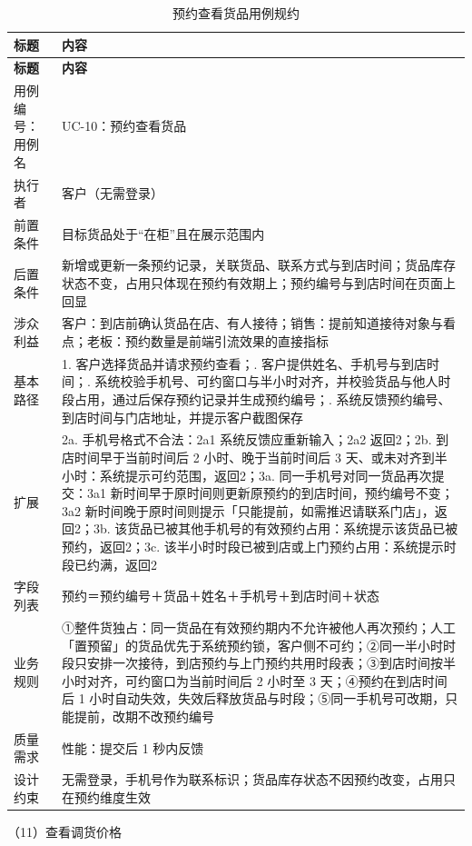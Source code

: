 {\small
\begin{longtable}{@{}L{3.0cm} L{12.3cm}@{}}
\caption{预约查看货品用例规约}\label{tab:uc-10}\\
\toprule
\textbf{标题} & \textbf{内容} \\
\midrule
\endfirsthead
\toprule
\textbf{标题} & \textbf{内容} \\
\midrule
\endhead
用例编号：用例名 & UC-10：预约查看货品 \\
\midrule
执行者 & 客户（无需登录） \\
\midrule
前置条件 & 目标货品处于“在柜”且在展示范围内 \\
\midrule
后置条件 & 新增或更新一条预约记录，关联货品、联系方式与到店时间；货品库存状态不变，占用只体现在预约有效期上；预约编号与到店时间在页面上回显 \\
\midrule
涉众利益 & 客户：到店前确认货品在店、有人接待；\newline 销售：提前知道接待对象与看点；\newline 老板：预约数量是前端引流效果的直接指标 \\
\midrule
基本路径 & 1. 客户选择货品并请求预约查看；. 客户提供姓名、手机号与到店时间；. 系统校验手机号、可约窗口与半小时对齐，并校验货品与他人时段占用，通过后保存预约记录并生成预约编号；. 系统反馈预约编号、到店时间与门店地址，并提示客户截图保存 \\
\midrule
扩展 & 2a. 手机号格式不合法：2a1 系统反馈应重新输入；2a2 返回2；\newline 2b. 到店时间早于当前时间后 2 小时、晚于当前时间后 3 天、或未对齐到半小时：系统提示可约范围，返回2；\newline 3a. 同一手机号对同一货品再次提交：3a1 新时间早于原时间则更新原预约的到店时间，预约编号不变；3a2 新时间晚于原时间则提示「只能提前，如需推迟请联系门店」，返回2；\newline 3b. 该货品已被其他手机号的有效预约占用：系统提示该货品已被预约，返回2；\newline 3c. 该半小时时段已被到店或上门预约占用：系统提示时段已约满，返回2 \\
\midrule
字段列表 & 预约＝预约编号＋货品＋姓名＋手机号＋到店时间＋状态 \\
\midrule
业务规则 & ①整件货独占：同一货品在有效预约期内不允许被他人再次预约；人工「置预留」的货品优先于系统预约锁，客户侧不可约；\newline ②同一半小时时段只安排一次接待，到店预约与上门预约共用时段表；\newline ③到店时间按半小时对齐，可约窗口为当前时间后 2 小时至 3 天；\newline ④预约在到店时间后 1 小时自动失效，失效后释放货品与时段；\newline ⑤同一手机号可改期，只能提前，改期不改预约编号 \\
\midrule
质量需求 & 性能：提交后 1 秒内反馈 \\
\midrule
设计约束 & 无需登录，手机号作为联系标识；货品库存状态不因预约改变，占用只在预约维度生效 \\
\midrule
\bottomrule
\end{longtable}}
\noindent（11）查看调货价格


